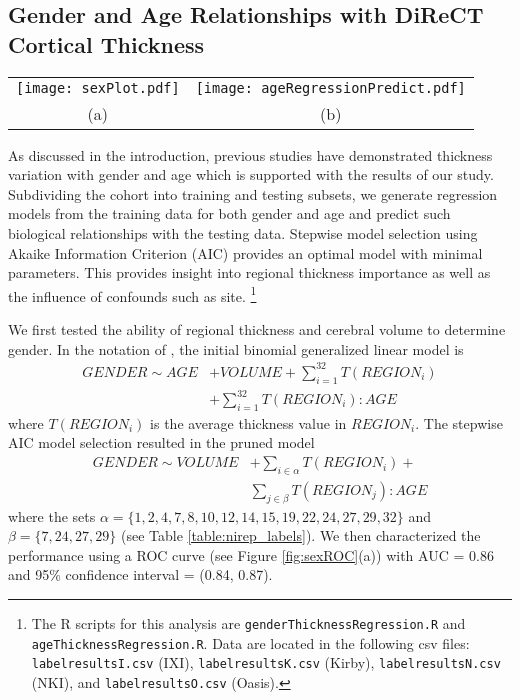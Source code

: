 \subsection{Gender and Age Relationships with DiReCT Cortical Thickness}

\begin{figure*}[htb]
  \centering
  \begin{tabular}{cc}
  \texttt{[image: sexPlot.pdf]} &
  \texttt{[image: ageRegressionPredict.pdf]} \\
  (a) &
  (b) 
  \end{tabular}
  \caption{(a) ROC curve based on a gender prediction model using total brain volume and regional thickness values (coupled with cross terms with age---cf Eqn. \ref{eq:roc}).  
  (b) Correlation plot for age prediction using regional thickness.
  }
  \label{fig:sexROC}
\end{figure*}

As discussed in the introduction, previous studies have demonstrated 
thickness variation with gender and age which is supported with
the results of our study.  Subdividing the cohort into training and
testing subsets, we generate regression models from the training data
for both gender and age and predict such biological relationships with 
the testing data. Stepwise model selection using Akaike Information Criterion
(AIC) provides an optimal model with minimal parameters.  This provides 
insight into regional thickness importance as well
as the influence of confounds such as site.%
\footnote{
The R scripts for this analysis are {\tt genderThicknessRegression.R} and
{\tt ageThicknessRegression.R}.  Data are located in the following csv files: 
{\tt labelresultsI.csv} (IXI), 
{\tt labelresultsK.csv} (Kirby),
{\tt labelresultsN.csv} (NKI), and
{\tt labelresultsO.csv} (Oasis).
}

We first tested the ability of regional thickness and cerebral volume to determine
gender.
In the notation of \cite{wilkinson1973}, the initial binomial 
generalized linear model is
\begin{align}
  GENDER \sim AGE &+ VOLUME + \sum_{i=1}^{32} T(REGION_{i}) \\ \nonumber
              &+\sum_{i=1}^{32} T(REGION_{i}):AGE
\end{align}
where $T(REGION_{i})$ is the average thickness value in $REGION_{i}$.
The stepwise AIC model selection resulted in the pruned model
\begin{align}
  \label{eq:roc}
  GENDER \sim VOLUME &+ \sum_{i \in \alpha} T(REGION_i) + \\ \nonumber 
                    & \sum_{j \in \beta} T(REGION_j):AGE
\end{align}
where the sets $\alpha = \{1,2,4,7,8,10,12,14,15,19,22,24,27,29,32\}$ and $\beta = \{7,24,27,29\}$ (see Table \ref{table:nirep_labels}).  We then characterized the performance using a ROC curve (see Figure \ref{fig:sexROC}(a)) with AUC = 0.86 and 95\% confidence interval = (0.84, 0.87). 
   
